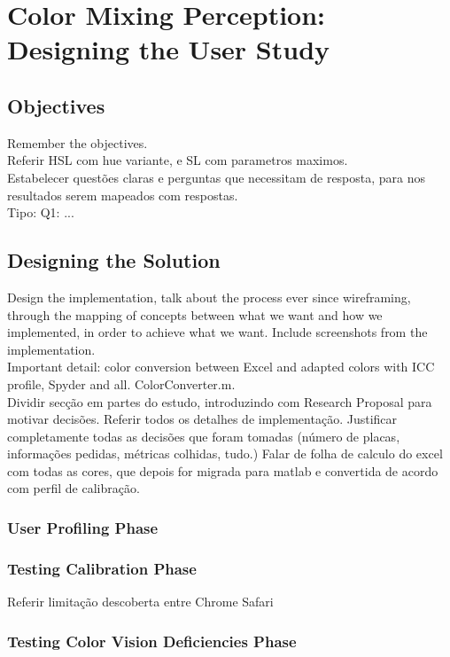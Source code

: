 
\chapter{Color Mixing Perception: Designing the User Study}
\label{chapter:design}

\section{Objectives}
\label{sec:impl_objectives}
Remember the objectives. \\
Referir HSL com hue variante, e SL com parametros maximos. \\
Estabelecer questões claras e perguntas que necessitam de resposta, para nos resultados serem mapeados com respostas. \\
Tipo: Q1: ...

\section{Designing the Solution}
\label{sec:impl_designingsolution}
Design the implementation, talk about the process ever since wireframing, through the mapping of concepts between
what we want and how we implemented, in order to achieve what we want. Include screenshots from the implementation. \\

Important detail: color conversion between Excel and adapted colors with ICC profile, Spyder and all. ColorConverter.m. \\
%
Dividir secção em partes do estudo, introduzindo com Research Proposal para motivar decisões. Referir todos os detalhes de implementação.
Justificar completamente todas as decisões que foram tomadas (número de placas, informações pedidas, métricas colhidas, tudo.)
%
Falar de folha de calculo do excel com todas as cores, que depois for migrada para matlab
e convertida de acordo com perfil de calibração.
%
\subsection{User Profiling Phase}
\label{subsec:design_profiling}
%
\subsection{Testing Calibration Phase}
\label{subsec:design_calibration}
%
Referir limitação descoberta entre Chrome Safari
%
\subsection{Testing Color Vision Deficiencies Phase}
\label{subsec:design_ishihara}
%
